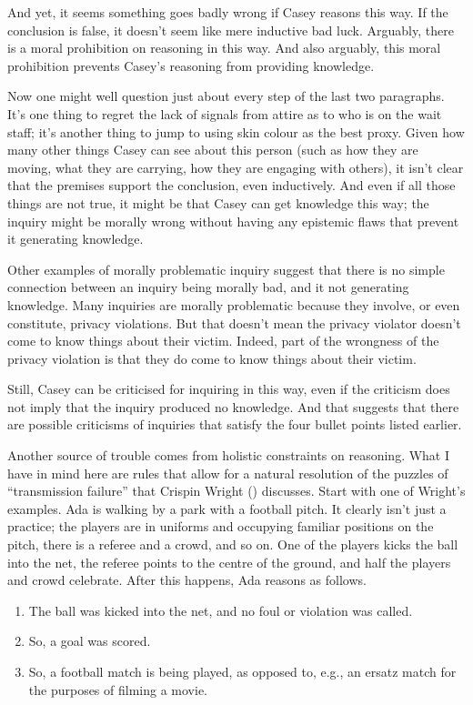 \documentclass[
  12pt,
  letterpaper,
]{scrbook}
\providecommand{\tightlist}{%
  \setlength{\itemsep}{0pt}\setlength{\parskip}{0pt}}\usepackage{longtable,booktabs,array}
\begin{document}
And yet, it seems something goes badly wrong if Casey reasons this way.
If the conclusion is false, it doesn't seem like mere inductive bad
luck. Arguably, there is a moral prohibition on reasoning in this way.
And also arguably, this moral prohibition prevents Casey's reasoning
from providing knowledge.

Now one might well question just about every step of the last two
paragraphs. It's one thing to regret the lack of signals from attire as
to who is on the wait staff; it's another thing to jump to using skin
colour as the best proxy. Given how many other things Casey can see
about this person (such as how they are moving, what they are carrying,
how they are engaging with others), it isn't clear that the premises
support the conclusion, even inductively. And even if all those things
are not true, it might be that Casey can get knowledge this way; the
inquiry might be morally wrong without having any epistemic flaws that
prevent it generating knowledge.

Other examples of morally problematic inquiry suggest that there is no
simple connection between an inquiry being morally bad, and it not
generating knowledge. Many inquiries are morally problematic because
they involve, or even constitute, privacy violations. But that doesn't
mean the privacy violator doesn't come to know things about their
victim. Indeed, part of the wrongness of the privacy violation is that
they do come to know things about their victim.

Still, Casey can be criticised for inquiring in this way, even if the
criticism does not imply that the inquiry produced no knowledge. And
that suggests that there are possible criticisms of inquiries that
satisfy the four bullet points listed earlier.

Another source of trouble comes from holistic constraints on reasoning.
What I have in mind here are rules that allow for a natural resolution
of the puzzles of ``transmission failure'' that Crispin Wright
() discusses. Start with one of Wright's
examples. Ada is walking by a park with a football pitch. It clearly
isn't just a practice; the players are in uniforms and occupying
familiar positions on the pitch, there is a referee and a crowd, and so
on. One of the players kicks the ball into the net, the referee points
to the centre of the ground, and half the players and crowd celebrate.
After this happens, Ada reasons as follows.

\begin{enumerate}
\def\labelenumi{\arabic{enumi}.}
\tightlist
\item
  The ball was kicked into the net, and no foul or violation was called.
\item
  So, a goal was scored.
\item
  So, a football match is being played, as opposed to, e.g., an ersatz
  match for the purposes of filming a movie.
\end{enumerate}
\end{document}
